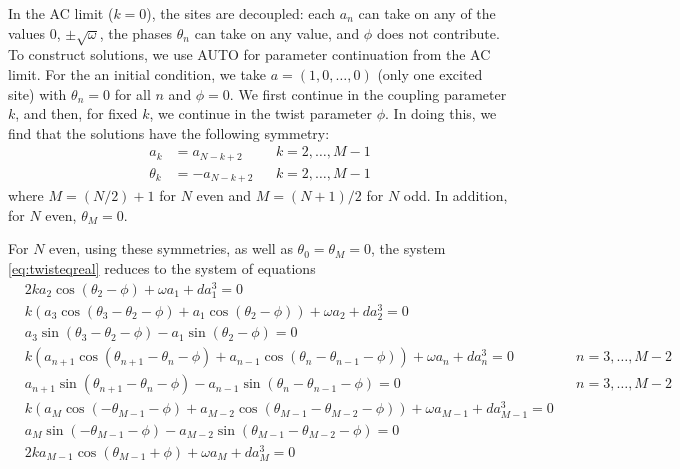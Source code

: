 \documentclass[12pt]{article}
\begin{document}
In the AC limit ($k = 0$), the sites are decoupled: each $a_n$ can take on any of the values 0, $\pm \sqrt{\omega}$, the phases $\theta_n$ can take on any value, and $\phi$ does not contribute. To construct solutions, we use AUTO for parameter continuation from the AC limit. For the an initial condition, we take $a = (1, 0, \dots, 0)$ (only one excited site) with $\theta_n = 0$ for all $n$ and $\phi = 0$. We first continue in the coupling parameter $k$, and then, for fixed $k$, we continue in the twist parameter $\phi$. In doing this, we find that the solutions have the following symmetry:
\begin{equation}
\begin{aligned}
a_k &= a_{N-k+2} && k = 2, \dots, M-1 \\
\theta_k &= -a_{N-k+2} && k = 2, \dots, M-1 
\end{aligned}
\end{equation}
where $M = (N/2)+1$ for $N$ even and $M = (N+1)/2$ for $N$ odd. In addition, for $N$ even, $\theta_M = 0$. 

For $N$ even, using these symmetries, as well as $\theta_0 = \theta_M = 0$, the system \cref{eq:twisteqreal} reduces to the system of equations
\begin{equation}\label{eq:twisteqeven}
\begin{aligned}
&2 k a_2 \cos(\theta_2 - \phi) + \omega a_1 + d a_1^3 = 0 \\
&k\left( a_3 \cos(\theta_3-\theta_2-\phi) + a_1 \cos(\theta_2-\phi)\right) + \omega a_2 + d a_2^3 = 0 \\
&a_3 \sin(\theta_3-\theta_2-\phi) - a_1 \sin(\theta_2-\phi) = 0 \\
&k\left( a_{n+1} \cos(\theta_{n+1}-\theta_n-\phi) + a_{n-1} \cos(\theta_n - \theta_{n-1}-\phi)\right) + \omega a_n + d a_n^3 = 0 && n = 3, \dots, M-2 \\
&a_{n+1} \sin(\theta_{n+1}-\theta_n-\phi) - a_{n-1} \sin(\theta_n - \theta_{n-1}-\phi) = 0 && n = 3, \dots, M-2 \\
&k\left( a_M \cos(-\theta_{M-1}-\phi) + a_{M-2} \cos(\theta_{M-1} - \theta_{M-2}-\phi)\right) + \omega a_{M-1} + d a_{M-1}^3 = 0 \\
&a_M \sin(-\theta_{M-1} -\phi) - a_{M-2} \sin(\theta_{M-1} - \theta_{M-2}-\phi) = 0 \\
&2 k a_{M-1} \cos(\theta_{M-1} + \phi) + \omega a_M + d a_M^3 = 0
\end{aligned}
\end{equation}
\end{document}
